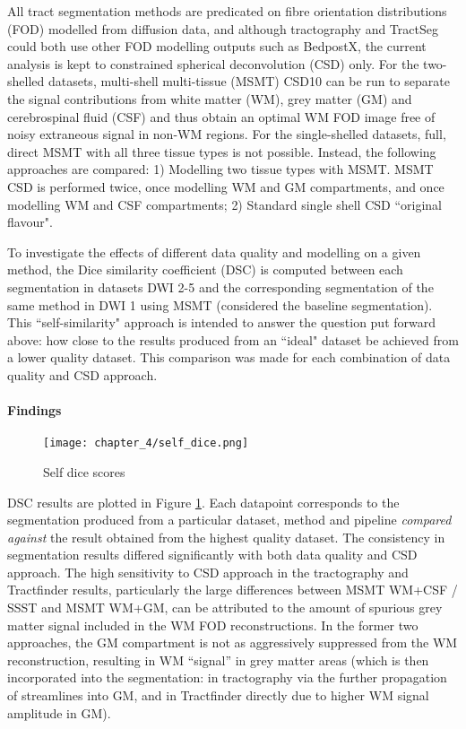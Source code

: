 All tract segmentation methods are predicated on fibre orientation distributions (FOD) modelled from diffusion data, and although tractography and TractSeg could both use other FOD modelling outputs such as BedpostX, the current analysis is kept to constrained spherical deconvolution (CSD) only.
For the two-shelled datasets, multi-shell multi-tissue (MSMT) CSD10 can be run to separate the signal contributions from white matter (WM), grey matter (GM) and cerebrospinal fluid (CSF) and thus obtain an optimal WM FOD image free of noisy extraneous signal in non-WM regions.
For the single-shelled datasets, full, direct MSMT with all three tissue types is not possible.
Instead, the following approaches are compared: 1) Modelling two tissue types with MSMT.
MSMT CSD is performed twice, once modelling WM and GM compartments, and once modelling WM and CSF compartments; 2) Standard single shell CSD ``original flavour".

To investigate the effects of different data quality and modelling on a given method, the Dice similarity coefficient (DSC) is computed between each segmentation in datasets DWI 2-5 and the corresponding segmentation of the same method in DWI 1 using MSMT (considered the baseline segmentation).
This ``self-similarity" approach is intended to answer the question put forward above: how close to the results produced from an ``ideal" dataset be achieved from a lower quality dataset.
This comparison was made for each combination of data quality and CSD approach.

\paragraph*{Findings}

\begin{figure}
  \centering
  \texttt{[image: chapter\_4/self\_dice.png]}
  \caption{Self dice scores }
  \label{fig:self_dice}
\end{figure}

DSC results are plotted in Figure \ref{fig:self_dice}.
Each datapoint corresponds to the segmentation produced from a particular dataset, method and pipeline \textit{compared against} the result obtained from the highest quality dataset.
The consistency in segmentation results differed significantly with both data quality and CSD approach.
The high sensitivity to CSD approach in the tractography and Tractfinder results, particularly the large differences between MSMT WM+CSF / SSST and MSMT WM+GM, can be attributed to the amount of spurious grey matter signal included in the WM FOD reconstructions.
In the former two approaches, the GM compartment is not as aggressively suppressed from the WM reconstruction, resulting in WM ``signal” in grey matter areas (which is then incorporated into the segmentation: in tractography via the further propagation of streamlines into GM, and in Tractfinder directly due to higher WM signal amplitude in GM).

